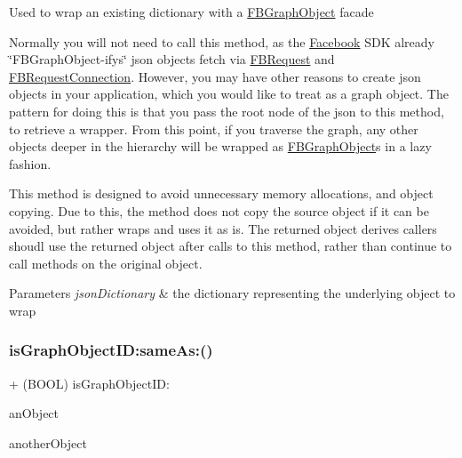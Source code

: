 Used to wrap an existing dictionary with a {\ttfamily \hyperlink{interfaceFBGraphObject}{F\+B\+Graph\+Object}} facade

Normally you will not need to call this method, as the \hyperlink{interfaceFacebook}{Facebook} S\+DK already \char`\"{}\+F\+B\+Graph\+Object-\/ifys\char`\"{} json objects fetch via {\ttfamily \hyperlink{interfaceFBRequest}{F\+B\+Request}} and {\ttfamily \hyperlink{interfaceFBRequestConnection}{F\+B\+Request\+Connection}}. However, you may have other reasons to create json objects in your application, which you would like to treat as a graph object. The pattern for doing this is that you pass the root node of the json to this method, to retrieve a wrapper. From this point, if you traverse the graph, any other objects deeper in the hierarchy will be wrapped as {\ttfamily \hyperlink{interfaceFBGraphObject}{F\+B\+Graph\+Object}}\textquotesingle{}s in a lazy fashion.

This method is designed to avoid unnecessary memory allocations, and object copying. Due to this, the method does not copy the source object if it can be avoided, but rather wraps and uses it as is. The returned object derives callers shoudl use the returned object after calls to this method, rather than continue to call methods on the original object.


\begin{DoxyParams}{Parameters}
{\em json\+Dictionary} & the dictionary representing the underlying object to wrap \\
\hline
\end{DoxyParams}
\mbox{\label{interfaceFBGraphObject_a62b9fd3318de27294b10860c9a62160c}} 
\subsubsection{\texorpdfstring{is\+Graph\+Object\+I\+D\+:same\+As\+:()}{isGraphObjectID:sameAs:()}\hspace{0.1cm}{\footnotesize\ttfamily [1/5]}}
{\footnotesize\ttfamily + (B\+O\+OL) is\+Graph\+Object\+I\+D\+: \begin{DoxyParamCaption}\item[{(id$<$ \hyperlink{interfaceFBGraphObject}{F\+B\+Graph\+Object} $>$)}]{an\+Object }\item[{sameAs:(id$<$ \hyperlink{interfaceFBGraphObject}{F\+B\+Graph\+Object} $>$)}]{another\+Object }\end{DoxyParamCaption}}

